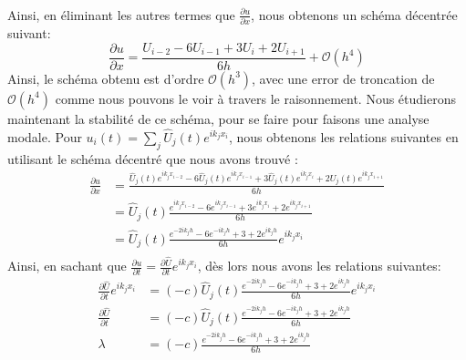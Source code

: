 \documentclass{article}
\begin{document}
\\
Ainsi, en éliminant les autres termes que $\frac{\partial u }{\partial x}$, nous obtenons un schéma décentrée suivant:\\
\begin{equation}
    \frac{\partial u }{\partial x} = \frac{ U_{i-2} - 6U_{i-1} + 3U_{i} + 2U_{i+1}  }{6h} + \mathcal{O}(h^4)
\end{equation}
Ainsi, le schéma obtenu est d'ordre $\mathcal{O}(h^3)$, avec une error de troncation de $\mathcal{O}(h^4)$ comme nous pouvons le voir à travers le raisonnement. Nous étudierons maintenant la stabilité de ce schéma, pour se faire pour faisons une analyse modale. Pour $u_i(t) = \sum_j \widehat{U}_j (t) e^{ik_j x_i}$, nous obtenons les relations suivantes en utilisant le schéma décentré que nous avons trouvé :\\
\begin{equation}
    \begin{aligned}
    \frac{\partial u }{\partial x} & = \frac{ \widehat{U}_j (t) e^{ik_j x_{i-2}} - 6\widehat{U}_j (t) e^{ik_j x_{i-1}} + 3\widehat{U}_j (t) e^{ik_j x_{i}} + 2\widehat{U}_j (t) e^{ik_j x_{i+1}}  }{6h} \\
                                   & = \widehat{U}_j (t) \frac{ e^{ik_j x_{i-2}} - 6 e^{ik_j x_{i-1}} + 3 e^{ik_j x_{i}} + 2 e^{ik_j x_{i+1}}  }{6h} \\
                                   & =  \widehat{U}_j (t) \frac{ e^{-2ik_j h} - 6 e^{-ik_j h} + 3 + 2 e^{ik_j h}  }{6h}  e^{ik_j x_{i}} \\
    \end{aligned}
\end{equation}
Ainsi, en sachant que $\frac{\partial u }{\partial t} = \frac{ \partial \widehat{U} }{ \partial t } e^{ik_j x_{i}}$, dès lors nous avons les relations suivantes:
\begin{equation}
    \begin{aligned}
         \frac{ \partial \widehat{U} }{ \partial t } e^{ik_j x_{i}} & =  (-c)\widehat{U}_j (t) \frac{ e^{-2ik_j h} - 6 e^{-ik_j h} + 3 + 2 e^{ik_j h}  }{6h}  e^{ik_j x_{i}}\\
          \frac{ \partial \widehat{U} }{ \partial t } & =  (-c)\widehat{U}_j (t) \frac{ e^{-2ik_j h} - 6 e^{-ik_j h} + 3 + 2 e^{ik_j h}  }{6h}\\
          \lambda & =  (-c)\frac{ e^{-2ik_j h} - 6 e^{-ik_j h} + 3 + 2 e^{ik_j h}  }{6h}\\
    \end{aligned}
\end{equation}
\end{document}
